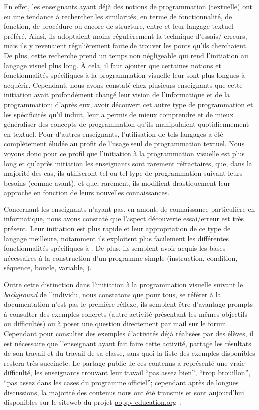         En effet, les enseignants ayant déjà des notions de programmation (textuelle) ont eu une tendance à rechercher les similarités, en terme de fonctionnalité, de fonction, de procédure ou encore de structure, entre  et leur langage textuel préféré. Ainsi, ils adoptaient moins régulièrement la technique d'essais/ erreurs, mais ils y revenaient régulièrement faute de trouver les ponts qu'ils cherchaient. De plus, cette recherche prend un temps non négligeable qui rend l'initiation au langage visuel plus long. À cela, il faut ajouter que certaines notions et fonctionnalités spécifiques à la programmation visuelle leur sont plus longues à acquérir. Cependant, nous avons constaté chez plusieurs enseignants que cette initiation avait profondément changé leur vision de l'informatique et de la programmation; d'après eux, avoir découvert cet autre type de programmation et les spécificités qu'il induit, leur a permis de mieux comprendre et de mieux généraliser des concepts de programmation qu'ils manipulaient quotidiennement en textuel. Pour d'autres enseignants, l'utilisation de tels langages a été complètement éludée au profit de l'usage seul de programmation textuel. Nous voyons donc pour ce profil que l'initiation à la programmation visuelle est plus long et qu'après initiation les enseignants sont rarement réfractaires, que, dans la majorité des cas, ils utiliseront tel ou tel type de programmation suivant leurs besoins (comme avant), et que, rarement, ils modifient drastiquement leur approche en fonction de leurs nouvelles connaissances.\par%
        Concernant les enseignants n'ayant pas, en amont, de connaissance particulière en informatique, nous avons constaté que  l'aspect découverte essai/erreur est très présent. Leur initiation est plus rapide et leur appropriation de ce type de langage meilleure, notamment ils exploitent plus facilement les différentes fonctionnalités spécifiques à . De plus, ils semblent avoir acquis les bases nécessaires à la construction d'un programme simple (instruction, condition, séquence, boucle, variable, \etc).\par%
        Outre cette distinction dans l'initiation à la programmation visuelle suivant le \textit{background} de l'individu, nous constatons que pour tous, se référer à la documentation n'est pas le première réflexe, ils semblent être d'avantage prompts à consulter des exemples concrets (autre activité présentant les mêmes objectifs ou difficultés) ou à poser une question directement par mail \etou sur le forum. Cependant pour consulter des exemples d'activités déjà réalisées par des élèves, il est nécessaire que l'enseignant ayant fait faire cette activité, partage les résultats de son travail et du travail de sa classe, sans quoi la liste des exemples disponibles restera très succincte. Le partage public de ces contenus a représenté une vraie difficulté, les enseignants trouvant leur travail “pas assez bien”, “trop brouillon”, “pas assez dans les cases du programme officiel”; cependant après de longues discussions, la majorité des contenus nous ont été transmis et sont aujourd'hui disponibles sur le siteweb du projet \href{https://www.poppy-education.org/}{poppy-education.org}~.
